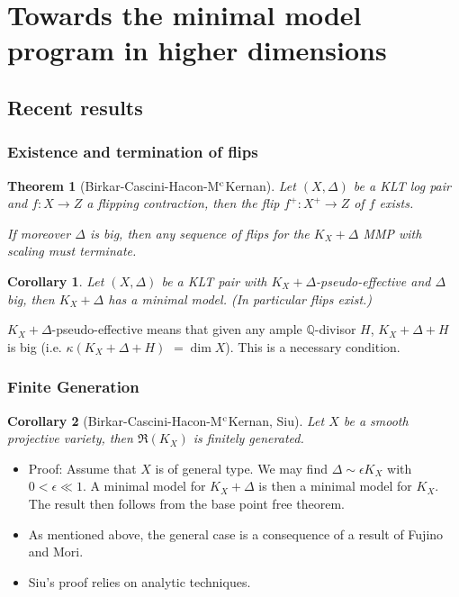 \documentclass{beamer}
\theoremstyle{plain}
\newtheorem*{thm}{Theorem}
\newtheorem*{cor}{Corollary}
\theoremstyle{definition}
\theoremstyle{remark}
\begin{document}
\section{Towards the minimal model program in higher dimensions}
\subsection{Recent results}

\begin{frame}
 \frametitle{Existence and termination of flips}
\begin{thm}[Birkar-Cascini-Hacon-M$^{\rm c}$Kernan] Let $(X,\Delta)$ be a KLT log pair and $f:X\to Z$ a flipping contraction, then the flip $f^+:X^+\to Z$ of $f$ exists.

If moreover $\Delta $ is big, then any sequence of flips for the $K_X+\Delta$ MMP with scaling must terminate.\end{thm}
\pause
\begin{cor} Let $(X,\Delta )$ be a KLT pair with $K_X+\Delta$-pseudo-effective
and $\Delta$ big, then $K_X+\Delta$ has a minimal model. (In particular flips exist.)
\end{cor}
\pause
$K_X+\Delta$-pseudo-effective means that given any ample $\mathbb{Q}$-divisor $H$, $K_X+\Delta+H$ is big (i.e. $\kappa (K_X+\Delta+H)$ $=\dim X$).
This is a necessary condition.

\end{frame}

\begin{frame}
\frametitle{Finite Generation}
\begin{cor} [Birkar-Cascini-Hacon-M$^{\rm c}$Kernan, Siu]
Let $X$ be a smooth projective variety, then
$\mathfrak{R}(K_X)$ is finitely generated.
\end{cor}
\begin{itemize}\pause
\item Proof: Assume that $X$ is of general type.
We may find $\Delta \sim \epsilon K_X$ with $0<\epsilon \ll 1$.
A minimal model for $K_X+\Delta$ is then a minimal model for $K_X$.
The result then follows from the base point free theorem.
\pause
\item As mentioned above, the general case is a consequence of a result of Fujino and Mori.
\pause
\item Siu's proof relies on analytic techniques.
\end{itemize}
\end{frame}
\end{document}
